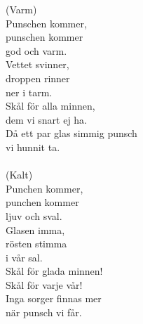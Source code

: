
(Varm) \\ Punschen kommer, \\ punschen kommer \\ god och varm. \\ Vettet svinner, \\ droppen rinner \\ ner i tarm. \\ Skål för alla minnen, \\ dem vi snart ej ha. \\ Då ett par glas simmig punsch \\ vi hunnit ta. \\ \hspace{10mm} \\ (Kalt) \\ Punchen kommer, \\ punchen kommer \\ ljuv och sval. \\ Glasen imma, \\ rösten stimma \\ i vår sal. \\ Skål för glada minnen! \\ Skål för varje vår! \\ Inga sorger finnas mer \\ när punsch vi får.